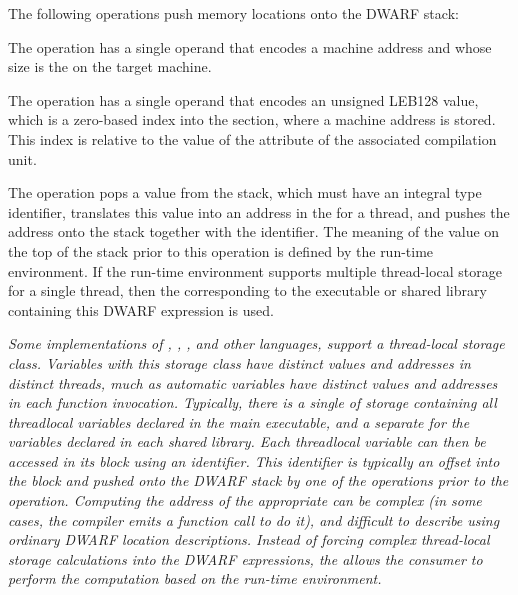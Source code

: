The following operations push memory locations onto the DWARF stack:

\begin{enumerate}[1. ]

\itembfnl{\DWOPaddrTARG}
The \DWOPaddrNAME{} operation has a single operand that encodes
a machine address and whose size is the 
on the target machine.

\itembfnl{\DWOPaddrxTARG}
The \DWOPaddrxNAME{} operation has a single operand that
encodes an unsigned LEB128 value,
which is a zero-based index into the \dotdebugaddr{} section,
where a machine address is stored.
This index is relative to the value of the
\DWATaddrbase{} attribute of the associated compilation unit.

\itembfnl{\DWOPformtlsaddressTARG}
The \DWOPformtlsaddressNAME{}
operation pops a value from the stack, which must have an
integral type identifier, translates this
value into an address in the
for a thread, and pushes the address
onto the stack together with the \generictype{} identifier.
The meaning of the value on the top of the stack prior to this
operation is defined by the run-time environment.  If the run-time
environment supports multiple thread-local storage
 for a single thread, then the 
corresponding to the executable or shared
library containing this DWARF expression is used.

\textit{Some implementations of
, , , and other
languages, support a
thread-local storage class. Variables with this storage class
have distinct values and addresses in distinct threads, much
as automatic variables have distinct values and addresses in
each function invocation. Typically, there is a single 
of storage containing all thread\dash local variables declared in
the main executable, and a separate  for the variables
declared in each shared library. Each
thread\dash local variable can then be accessed in its block using an
identifier. This identifier is typically an offset into the block and
pushed onto the DWARF stack by one of the
\DWOPconstnx{} operations prior to the
\DWOPformtlsaddress{} operation.
Computing the address of
the appropriate  can be complex (in some cases, the
compiler emits a function call to do it), and difficult
to describe using ordinary DWARF location descriptions.
Instead of    forcing complex thread-local storage calculations into
the DWARF expressions, the \DWOPformtlsaddress{} allows the consumer
to perform the computation based on the run-time environment.}


\end{enumerate}
